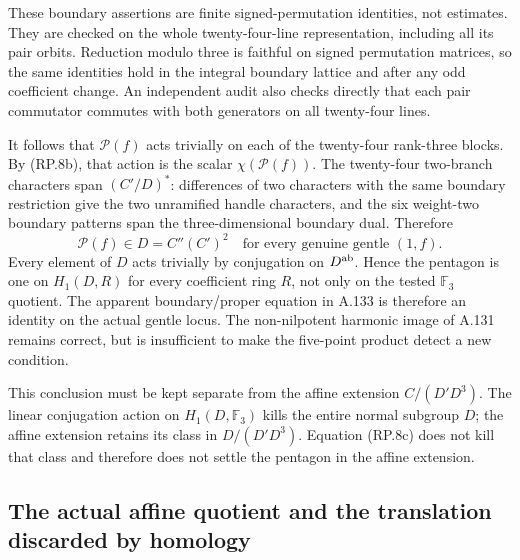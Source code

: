 These boundary assertions are finite signed-permutation
identities, not estimates. They are checked on the
whole twenty-four-line representation, including all
its pair orbits. Reduction modulo three is faithful
on signed permutation matrices, so the same identities
hold in the integral boundary lattice and after any
odd coefficient change. An independent audit also
checks directly that each pair commutator commutes
with both generators on all twenty-four lines.

It follows that $\mathcal P(f)$ acts trivially on
each of the twenty-four rank-three blocks. By
(RP.8b), that action is the scalar
$\chi(\mathcal P(f))$. The twenty-four two-branch
characters span $(C'/D)^*$: differences of two
characters with the same boundary restriction
give the two unramified handle characters, and
the six weight-two boundary patterns span the
three-dimensional boundary dual. Therefore
\[
                \boxed{\ \mathcal P(f)\in D
                    =C''(C')^2\quad
                    \text{for every genuine gentle }(1,f).\ }
 \tag{RP.8c}
\]
Every element of $D$ acts trivially by conjugation
on $D^{\rm ab}$. Hence the pentagon is one on
$H_1(D,R)$ for every coefficient ring $R$, not
only on the tested $\mathbb F_3$ quotient.
The apparent boundary/proper equation in A.133
is therefore an identity on the actual gentle
locus. The non-nilpotent harmonic image of
A.131 remains correct, but is insufficient
to make the five-point product detect a new
condition.

This conclusion must be kept separate from
the affine extension
$C/(D'D^3)$. The linear conjugation action
on $H_1(D,\mathbb F_3)$ kills the entire
normal subgroup $D$; the affine extension
retains its class in $D/(D'D^3)$. Equation
(RP.8c) does not kill that class and therefore
does not settle the pentagon in the affine
extension.

\subsection{The actual affine quotient and the translation discarded by homology}


